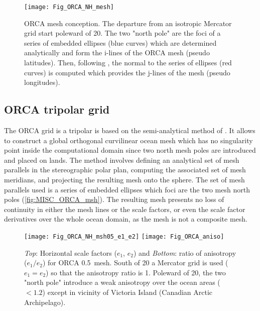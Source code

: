 \documentclass[../main/NEMO_manual]{subfiles}
\begin{document}
\begin{figure}[!t]
  \begin{center}
    \texttt{[image: Fig\_ORCA\_NH\_mesh]}
    \caption{
      \protect\label{fig:MISC_ORCA_msh}
      ORCA mesh conception.
      The departure from an isotropic Mercator grid start poleward of 20.
      The two "north pole" are the foci of a series of embedded ellipses (blue curves) which
      are determined analytically and form the i-lines of the ORCA mesh (pseudo latitudes).
      Then, following \citet{Madec_Imbard_CD96}, the normal to the series of ellipses (red curves) is computed which
      provides the j-lines of the mesh (pseudo longitudes).
    }
  \end{center}
\end{figure}

\subsection{ORCA tripolar grid}
\label{subsec:CFG_orca_grid}

The ORCA grid is a tripolar is based on the semi-analytical method of \citet{Madec_Imbard_CD96}.
It allows to construct a global orthogonal curvilinear ocean mesh which has no singularity point inside
the computational domain since two north mesh poles are introduced and placed on lands.
The method involves defining an analytical set of mesh parallels in the stereographic polar plan,
computing the associated set of mesh meridians, and projecting the resulting mesh onto the sphere.
The set of mesh parallels used is a series of embedded ellipses which foci are the two mesh north poles
(\autoref{fig:MISC_ORCA_msh}).
The resulting mesh presents no loss of continuity in either the mesh lines or the scale factors,
or even the scale factor derivatives over the whole ocean domain, as the mesh is not a composite mesh. 
\begin{figure}[!tbp]
  \begin{center}
    \texttt{[image: Fig\_ORCA\_NH\_msh05\_e1\_e2]}
    \texttt{[image: Fig\_ORCA\_aniso]}
    \caption {
      \protect\label{fig:MISC_ORCA_e1e2}
      \textit{Top}: Horizontal scale factors ($e_1$, $e_2$) and
      \textit{Bottom}: ratio of anisotropy ($e_1 / e_2$)
      for ORCA 0.5\deg ~mesh.
      South of 20 a Mercator grid is used ($e_1 = e_2$) so that the anisotropy ratio is 1.
      Poleward of 20, the two "north pole" introduce a weak anisotropy over the ocean areas ($< 1.2$) except in
      vicinity of Victoria Island (Canadian Arctic Archipelago).
    }
  \end{center}
\end{figure}
\end{document}
